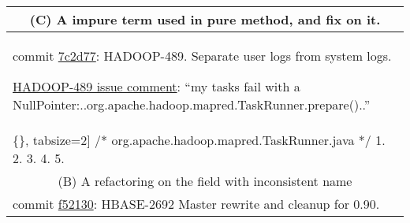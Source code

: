 \begin{figure*}[!htb]
\begin{minipage}{0.47\textwidth}
\begin{itemize}
 \end{itemize} 
  \end{minipage}
  \hfill
 \begin{minipage}{0.47\textwidth}
 \scriptsize 
 \begin{tabular}{p{}}
  \hline 
   \multicolumn{1}{c}{(C) A impure term used in pure method, and fix on it.} \\ \hline
commit  \href{https://github.com/apache/hadoop/commit/7c2d77#diff-c0169961c9fbca7c0a7b3afb2049665a}{7c2d77}: HADOOP-489. Separate user logs from system logs.

\href{https://issues.apache.org/jira/browse/HADOOP-489}{HADOOP-489 issue comment}: ``my tasks fail with a NullPointer:..org.apache.hadoop.mapred.TaskRunner.prepare()..''
 \vspace*{-3mm}
 \begin{Verbatim}[commandchars=\\\{\}, tabsize=2]
 /* org.apache.hadoop.mapred.TaskRunner.java */
1.\color{red}{ -  public boolean prepare() throws IOException \{return true;\}}
2.\color{blue}{+  public boolean prepare() throws IOException \{}
3.\color{blue}{+    taskLogWriter.init();         }
4.\color{blue}{+    return true;}
5.\color{blue}{+  \}}
  \end{Verbatim}
  \vspace*{-4mm}
 \\  \hline
   \multicolumn{1}{c}{(B) A refactoring on the field with inconsistent name} \\ \hline
commit \href{https://github.com/apache/hbase/commit/f52130953245d93489a9c700c3b00eedbe70fdb9/src/main/java/org/apache/hadoop/hbase/regionserver/HRegion.java}{f52130}: HBASE-2692 Master rewrite and cleanup for 0.90. 


\end{tabular}
\end{minipage}
\end{figure*}
